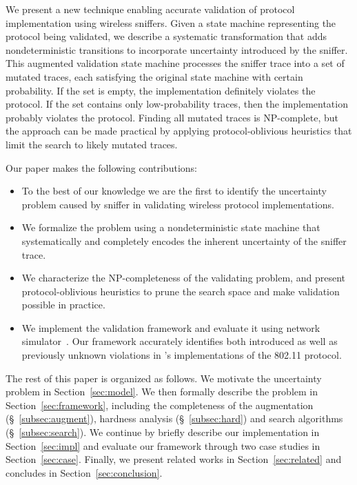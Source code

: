 We present a new technique enabling accurate validation of protocol
implementation using wireless sniffers.
%
Given a state machine representing the protocol being validated, we describe a
systematic transformation that adds nondeterministic transitions to
incorporate uncertainty introduced by the sniffer.
%
This augmented validation state machine processes the sniffer trace into a set
of mutated traces, each satisfying the original state machine with certain
probability.
%
If the set is empty, the implementation definitely violates the protocol.
%
If the set contains only low-probability traces, then the implementation
probably violates the protocol.
%
Finding all mutated traces is NP-complete, but the approach can be made
practical by applying protocol-oblivious heuristics that limit the search to
likely mutated traces.

Our paper makes the following contributions:
%
\begin{itemize}
  \item To the best of our knowledge we are the first to identify the
    uncertainty problem caused by sniffer in validating wireless protocol
    implementations.
  \item We formalize the problem using a nondeterministic state machine that
    systematically and completely encodes the inherent uncertainty of the
    sniffer trace.
    \item We characterize the NP-completeness of the validating problem, and
      present protocol-oblivious heuristics to prune the search
      space and make validation possible in practice.
	\item We implement the validation framework and evaluate it using
    \ns{} network simulator~\cite{riley2010ns}.
    Our framework accurately identifies both introduced as well as previously
    unknown violations in \ns{}'s implementations of the 802.11 protocol.
\end{itemize}

The rest of this paper is organized as follows.
%
We motivate the uncertainty problem in Section~\ref{sec:model}.
%
We then formally describe the problem in Section~\ref{sec:framework},
including the completeness of the augmentation (\S~\ref{subsec:augment}),
hardness analysis (\S~\ref{subsec:hard}) and search algorithms
(\S~\ref{subsec:search}).
%
We continue by briefly describe our implementation in Section~\ref{sec:impl} and
evaluate our framework through two case studies in Section~\ref{sec:case}.
Finally, we present related works in Section~\ref{sec:related} and concludes in
Section~\ref{sec:conclusion}.
